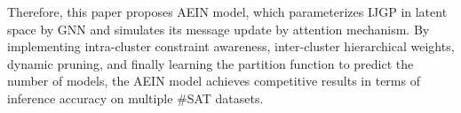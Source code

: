 Therefore, this paper proposes AEIN model, which parameterizes IJGP in latent space by GNN and simulates its message 
update by attention mechanism. By implementing intra-cluster constraint awareness, inter-cluster hierarchical weights, 
dynamic pruning\cite{DBLP:conf/icip/LiCLCSQW23}\cite{DBLP:journals/nn/ZhangLWWW24}, and finally learning the partition 
function\cite{Bethe_1997_07}\cite{DBLP:journals/siamdm/ChandrasekaranCGSS11} to predict the number of models, the AEIN 
model achieves competitive results in terms of inference accuracy on multiple \#SAT datasets.